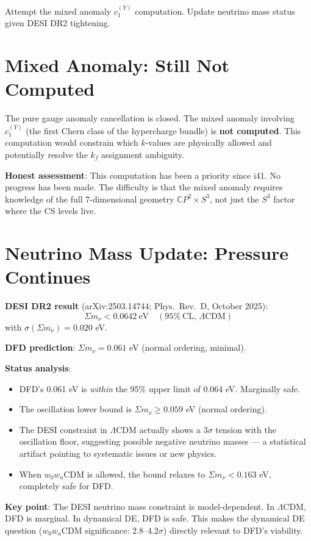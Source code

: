\documentclass[11pt,a4paper]{article}
\newcommand{\CP}{\mathbb{C}P}
\begin{document}
Attempt the mixed anomaly $c_1^{(Y)}$ computation. Update neutrino mass status given DESI DR2 tightening.

\section{Mixed Anomaly: Still Not Computed}

The pure gauge anomaly cancellation is closed. The mixed anomaly involving $c_1^{(Y)}$ (the first Chern class of the hypercharge bundle) is \textbf{not computed}. This computation would constrain which $k$-values are physically allowed and potentially resolve the $k_f$ assignment ambiguity.

\textbf{Honest assessment}: This computation has been a priority since i41. No progress has been made. The difficulty is that the mixed anomaly requires knowledge of the full 7-dimensional geometry $\CP^2 \times S^3$, not just the $S^3$ factor where the CS levels live.

\section{Neutrino Mass Update: Pressure Continues}

\begin{tcolorbox}[colback=yellow!5!white, colframe=yellow!60!black,
  title={DESI DR2 + Planck: $\Sigma m_\nu < 0.064$ eV (95\%)}]

\textbf{DESI DR2 result} (arXiv:2503.14744; Phys.\ Rev.\ D, October 2025):
\begin{equation}
\Sigma m_\nu < 0.0642~\text{eV} \quad (95\%~\text{CL, } \Lambda\text{CDM})
\end{equation}
with $\sigma(\Sigma m_\nu) = 0.020$ eV.

\textbf{DFD prediction}: $\Sigma m_\nu = 0.061$ eV (normal ordering, minimal).

\textbf{Status analysis}:
\begin{itemize}
\item DFD's 0.061 eV is \emph{within} the 95\% upper limit of 0.064 eV. Marginally safe.
\item The oscillation lower bound is $\Sigma m_\nu \geq 0.059$ eV (normal ordering).
\item The DESI constraint in $\Lambda$CDM actually shows a $3\sigma$ tension with the oscillation floor, suggesting possible negative neutrino masses --- a statistical artifact pointing to systematic issues or new physics.
\item When $w_0 w_a$CDM is allowed, the bound relaxes to $\Sigma m_\nu < 0.163$ eV, completely safe for DFD.
\end{itemize}

\textbf{Key point}: The DESI neutrino mass constraint is model-dependent. In $\Lambda$CDM, DFD is marginal. In dynamical DE, DFD is safe. This makes the dynamical DE question ($w_0 w_a$CDM significance: $2.8$--$4.2\sigma$) directly relevant to DFD's viability.
\end{tcolorbox}
\end{document}

